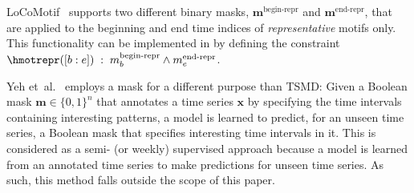 %
%
LoCoMotif~\citep{locomotif} supports two different binary masks, $\mathbf{m}^{\text{begin-repr}}$ and $\mathbf{m}^{\text{end-repr}}$, that are applied to the beginning and end time indices of \emph{representative} motifs only. 
%
This functionality can be implemented in \locomotifdok by defining the constraint
${\hmotrepr([b:e]) \;:\; m^{\text{begin-repr}}_b \land m^{\text{end-repr}}_e}$.
%
%
%
%
%
%
%

Yeh et~al.~\cite{matrixprofileIV} employs a mask for a different purpose than TSMD: 
%
Given a Boolean mask $\mathbf{m} \in \{ 0,1 \} ^n $ that annotates a time series $\mathbf{x}$ by specifying the time intervals containing interesting patterns, 
%
a model is learned to 
predict, for an unseen time series, a Boolean mask that specifies interesting time intervals in it.
%
%
This is considered as a semi- (or weekly) supervised approach 
%
because a model is learned from an annotated time series to make predictions for unseen time series.
%
As such, this method falls outside the scope of this paper.

%
%
%
%
%

%

%
%
%
%
%
%
%
%
%

%
%
%
%

%

%
%
%

%
%
%
%
%
%
%
%
%
%

%
%
%
%

%
%
%
%
%
%
%
%
%

%
%
%
%
%
%
%
%

%
%

%

%
%

%

%



%

%
%
%
%

%
%
%
%
%
%

%
%
%

%
%

%
%
%
%

%

%
%
%
%
%
%
%
%
%
%
%
%
%
%

%
%
%
%
%

%
%
%

%

%
%